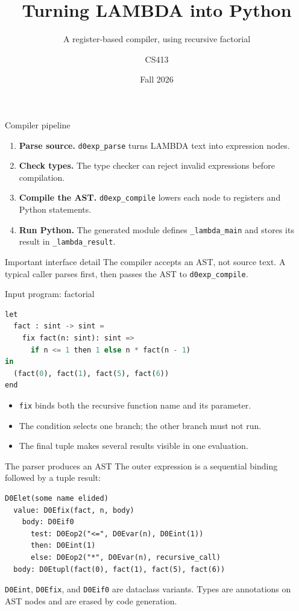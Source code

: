 \documentclass[aspectratio=169,10pt]{beamer}
\title{Turning LAMBDA into Python}
\subtitle{A register-based compiler, using recursive factorial}
\author{CS413}
\date{Fall 2026}
\begin{document}
\begin{frame}[plain]
  \titlepage
\end{frame}

\begin{frame}{Compiler pipeline}
  \begin{enumerate}
    \item \textbf{Parse source.} \texttt{d0exp\_parse} turns LAMBDA text into expression nodes.
    \item \textbf{Check types.} The type checker can reject invalid expressions before compilation.
    \item \textbf{Compile the AST.} \texttt{d0exp\_compile} lowers each node to registers and Python statements.
    \item \textbf{Run Python.} The generated module defines \texttt{\_lambda\_main} and stores its result in \texttt{\_lambda\_result}.
  \end{enumerate}
  \vspace{0.6em}
  \begin{block}{Important interface detail}
    The compiler accepts an AST, not source text. A typical caller parses first, then passes the AST to \texttt{d0exp\_compile}.
  \end{block}
\end{frame}

\begin{frame}[fragile]{Input program: factorial}
  \begin{lstlisting}[language=Python]
let
  fact : sint -> sint =
    fix fact(n: sint): sint =>
      if n <= 1 then 1 else n * fact(n - 1)
in
  (fact(0), fact(1), fact(5), fact(6))
end
  \end{lstlisting}
  \vspace{0.3em}
  \begin{itemize}
    \item \texttt{fix} binds both the recursive function name and its parameter.
    \item The condition selects one branch; the other branch must not run.
    \item The final tuple makes several results visible in one evaluation.
  \end{itemize}
\end{frame}

\begin{frame}[fragile]{The parser produces an AST}
  The outer expression is a sequential binding followed by a tuple result:
  \begin{lstlisting}
D0Elet(some name elided)
  value: D0Efix(fact, n, body)
    body: D0Eif0
      test: D0Eop2("<=", D0Evar(n), D0Eint(1))
      then: D0Eint(1)
      else: D0Eop2("*", D0Evar(n), recursive_call)
  body: D0Etupl(fact(0), fact(1), fact(5), fact(6))
  \end{lstlisting}
  \vspace{0.3em}
  \texttt{D0Eint}, \texttt{D0Efix}, and \texttt{D0Eif0} are dataclass variants. Types are annotations on AST nodes and are erased by code generation.
\end{frame}
\end{document}
